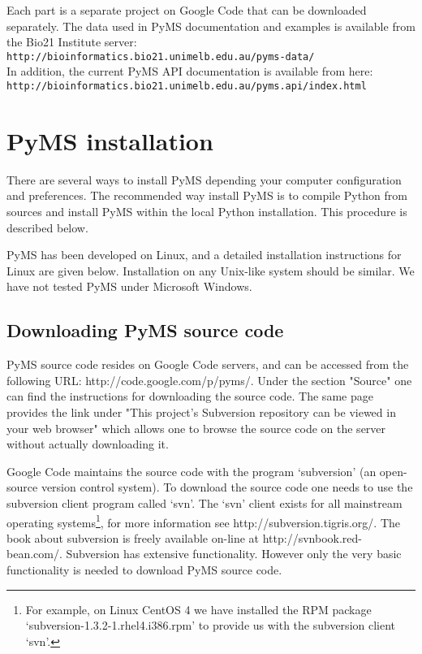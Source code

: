 Each part is a separate project on Google Code that can be downloaded
separately. The data used in PyMS documentation and examples is available
from the Bio21 Institute server:\\
{\tt http://bioinformatics.bio21.unimelb.edu.au/pyms-data/}\\
In addition, the current PyMS API documentation is available from here:\\
{\tt http://bioinformatics.bio21.unimelb.edu.au/pyms.api/index.html}

\section{PyMS installation}

There are several ways to install PyMS depending your computer configuration
and preferences. The recommended way install PyMS is to compile Python
from sources and install PyMS within the local Python installation. This
procedure is described below.

PyMS has been developed on Linux, and a detailed installation instructions
for Linux are given below. Installation on any Unix-like system should be
similar. We have not tested PyMS under Microsoft Windows.

\subsection{Downloading PyMS source code}

PyMS source code resides on Google Code servers, and can be accessed
from the following URL: http://code.google.com/p/pyms/. Under the
section "Source" one can find the instructions for downloading the
source code. The same page provides the link under "This project's
Subversion repository can be viewed in your web browser" which allows
one to browse the source code on the server without actually downloading
it.

Google Code maintains the source code with the program `subversion'
(an open-source version control system). To download the source code
one needs to use the subversion client program called `svn'. The `svn'
client exists for all mainstream operating systems\footnote{For example,
on Linux CentOS 4 we have installed the RPM package
`subversion-1.3.2-1.rhel4.i386.rpm' to provide us with the subversion
client `svn'.}, for more information see http://subversion.tigris.org/.
The book about subversion is freely available on-line at
http://svnbook.red-bean.com/. Subversion has extensive functionality.
However only the very basic functionality is needed to download PyMS
source code.


